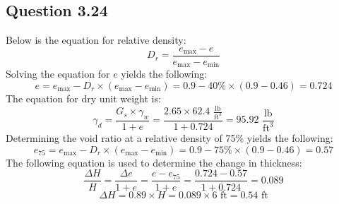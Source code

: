 \documentclass{article}
\begin{document}
\subsection*{Question 3.24}
Below is the equation for relative density: 
\[D_r=\frac{e_\text{max}-e}{e_\text{max}-e_\text{min}}\]
Solving the equation for $e$ yields the following: 
\[e=e_\text{max}-D_r\times(e_\text{max}-e_\text{min})=0.9-40\%\times(0.9-0.46)=0.724\] 
The equation for dry unit weight is: 
\[\gamma_d = \frac{G_s\times\gamma_w}{1+e}=\frac{2.65\times62.4\,\,\frac{\text{lb}}{\text{ft}^3}}{1+0.724}=\boxed{95.92\,\,\frac{\text{lb}}{\text{ft}^3}}\]
Determining the void ratio at a relative density of 75\% yields the following: 
\[e_{75}=e_\text{max}-D_r\times(e_\text{max}-e_\text{min})=0.9-75\%\times(0.9-0.46)=0.57\] 
The following equation is used to determine the change in thickness: 
\[\frac{\Delta H}{H}=\frac{\Delta e}{1+e}=\frac{e-e_{75}}{1+e}=\frac{0.724-0.57}{1+0.724}=0.089\]
\[\Delta H = 0.89\times H = 0.089\times 6 \text{ ft}=\boxed{0.54\text{ ft}}\]
\end{document}
